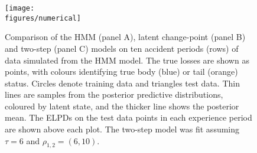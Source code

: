 \begin{figure}
    \vspace{-1.25cm}
    \centering
    \texttt{[image: \\figures/numerical]}
    \caption{
        Comparison of the HMM (panel A), 
        latent change-point (panel B)
        and two-step (panel C) models on ten accident
        periods (rows) of data simulated from
        the HMM model.
        The true losses
        are shown as points, with colours
        identifying true
        body (blue) or tail (orange) status.
        Circles denote training data and
        triangles test data. Thin 
        lines are samples from the posterior
        predictive distributions, coloured
        by latent state, and the thicker
        line shows the posterior mean.
        The ELPDs on the test data
        points in each experience period
        are shown above each plot.
        The two-step model was fit
        assuming $\tau = 6$ and
        $\rho_{1,2} = (6, 10)$.
    }
	\label{fig:numerical}
\end{figure}

